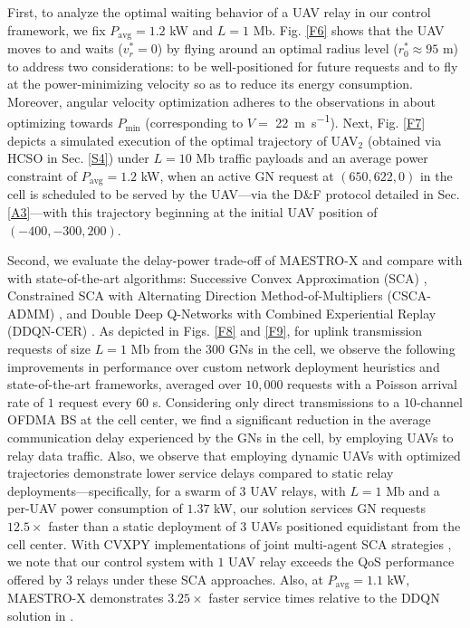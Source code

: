 \documentclass[12pt, draftcls, onecolumn]{IEEEtran}
\theoremstyle{plain}
\theoremstyle{definition}
\theoremstyle{remark}
\begin{document}
First, to analyze the optimal waiting behavior of a UAV relay in our control framework, we fix $P_{\mathrm{avg}}{=}1.2$ kW and $L{=}1$ Mb. Fig. \ref{F6} shows that the UAV moves to and waits ($v_{r}^{*}{=}0$) by flying around an optimal radius level ($r_{0}^{*}{\approx}95$ m) to address two considerations: to be well-positioned for future requests and to fly at the power-minimizing velocity so as to reduce its energy consumption. Moreover, angular velocity optimization adheres to the observations in \cite{SCA} about optimizing towards $P_{\mathrm{min}}$ (corresponding to $V{=}$ \qty[mode=text]{22}{\meter\per\second}). Next, Fig. \ref{F7} depicts a simulated execution of the optimal trajectory of UAV$_{2}$ (obtained via HCSO in Sec. \ref{S4}) under $L{=}10$ Mb traffic payloads and an average power constraint of $P_{\text{avg}}{=}1.2$ kW, when an active GN request at $(650,622,0)$ in the cell is scheduled to be served by the UAV---via the D\&F protocol detailed in Sec. \ref{A3}---with this trajectory beginning at the initial UAV position of $(-400,-300,200)$.

Second, we evaluate the delay-power trade-off of MAESTRO-X and compare with with state-of-the-art algorithms: Successive Convex Approximation (SCA) \cite{SCA}, Constrained SCA with Alternating Direction Method-of-Multipliers (CSCA-ADMM) \cite{CSCA-ADMM}, and Double Deep Q-Networks with Combined Experiential Replay (DDQN-CER) \cite{DDQN}. As depicted in Figs. \ref{F8} and \ref{F9}, for uplink transmission requests of size $L{=}1$ Mb from the $300$ GNs in the cell, we observe the following improvements in performance over custom network deployment heuristics and state-of-the-art frameworks, averaged over $10,000$ requests with a Poisson arrival rate of $1$ request every $60$ s. Considering only direct transmissions to a $10$-channel OFDMA BS at the cell center, we find a significant reduction in the average communication delay experienced by the GNs in the cell, by employing UAVs to relay data traffic. Also, we observe that employing dynamic UAVs with optimized trajectories demonstrate lower service delays compared to static relay deployments---specifically, for a swarm of $3$ UAV relays, with $L{=}1$ Mb and a per-UAV power consumption of $1.37$ kW, our solution services GN requests $12.5{\times}$ faster than a static deployment of $3$ UAVs positioned equidistant from the cell center. With CVXPY implementations of joint multi-agent SCA strategies \cite{SCA, CSCA-ADMM}, we note that our control system with $1$ UAV relay exceeds the QoS performance offered by $3$ relays under these SCA approaches. Also, at $P_{\text{avg}}{=}1.1$ kW, MAESTRO-X demonstrates $3.25{\times}$ faster service times relative to the DDQN solution in \cite{DDQN}. 
\end{document}
